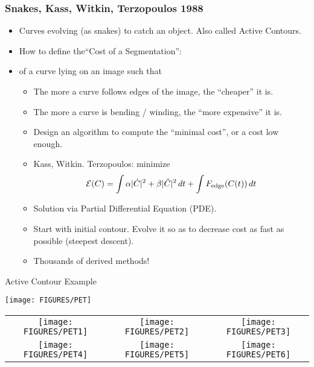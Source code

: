\documentclass[9pt]{beamer}
\newcommand{\myemph}[1]{{\color{blue}{#1}}}
\begin{document}
\begin{frame}\frametitle {Snakes, Kass, Witkin, Terzopoulos 1988}
  \begin{itemize}
  \item Curves evolving (as snakes) to catch an object. Also called Active Contours.
  \item How to define the``Cost of a Segmentation'':
  \item \myemph{Cost} of a curve lying on an image such that
    \begin{itemize}
    \item The more a curve follows edges of the image, the ``cheaper'' it is. \vfill
    \item The more a curve is bending / winding, the ``more expensive'' it is.\vfill
    \item Design an algorithm to compute the ``minimal cost'', or a cost low enough. \vfill
    \item Kass, Witkin. Terzopoulos: minimize
      $$
      {\mathcal E}(C) = \int \alpha|\dot{C}|^2+ \beta|\ddot{C}|^2\,dt + \int F_{\text{edge}}(C(t))\,dt
      $$
    \item Solution via Partial Differential Equation (PDE).\vfill
    \item  Start with initial contour. Evolve it so as to decrease cost as fast as possible (steepest descent).\vfill
    \item Thousands of derived methods!
    \end{itemize}
  \end{itemize}

\end{frame}


\begin{frame}[t]{Active Contour Example}
  \begin{center}
    \texttt{[image: FIGURES/PET]}
  \end{center}
  \begin{center}
    \begin{tabular}[h]{ccc}
       \texttt{[image: FIGURES/PET1]}&
       \texttt{[image: FIGURES/PET2]}&
       \texttt{[image: FIGURES/PET3]}\\
       \texttt{[image: FIGURES/PET4]}&
       \texttt{[image: FIGURES/PET5]}&
       \texttt{[image: FIGURES/PET6]}
    \end{tabular}
  \end{center}
\end{frame}
\end{document}
